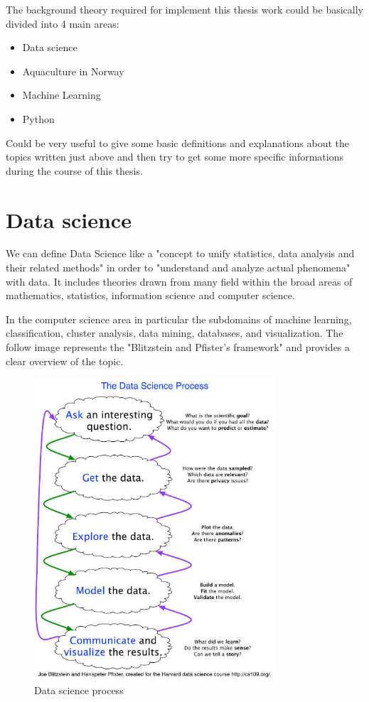 

The background theory required for implement this thesis work could be basically divided into 4 main areas:
\begin{itemize}
\item Data science
\item Aquaculture in Norway
\item Machine Learning
\item Python
\end{itemize}

Could be very useful to give some basic definitions and explanations about the topics written just above and then try to get some more specific informations during the course of this thesis.

\newpage
\section{Data science}
We can define Data Science like a "concept to unify statistics, data analysis and their related methods" in order to "understand and analyze actual phenomena" with data.
It includes theories drawn from many field within the broad areas of mathematics, statistics, information science and computer science.

In the computer science area in particular the subdomains of machine learning, classification, cluster analysis, data mining, databases, and visualization.
The follow image represents the "Blitzstein and Pfister's framework" and provides a clear overview of the topic.

\begin{figure}[h]
    \centering
    \includegraphics[trim=0cm 0.7cm 0cm 0cm, clip=true, width=0.8\textwidth,natwidth=610,natheight=642]{Files/Data_Science_Process_2.jpg}
    \caption[Data science process]{Data science process}
    \label{fig: Data_science}
\end{figure}

